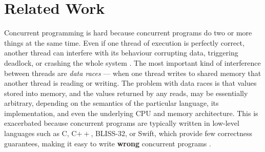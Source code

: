 \section{Related Work}
	
%


Concurrent programming is hard \cite{lea98,concurrentHard}
%
%
%
because concurrent programs do two or more things at the same
time. Even if one thread of execution is perfectly correct, another
thread can interfere with its behaviour corrupting data, triggering
deadlock, or crashing the whole system \cite{fonesca2010}.
%
%
The most important kind of interference between threads are
\textit{data races} --- when one thread writes to shared memory that
another thread is reading or writing. 
The problem with data races is
that values stored into memory, and the values returned by any reads,
may be essentially arbitrary, depending on the semantics of the
particular language, its implementation, and even the underlying CPU
and memory architecture.
%
This is exacerbated because concurrent programs are typically written in low-level languages
such as C, C$++$, BLISS-32, or Swift, which provide
few correctness guarantees, making it easy to write \textbf{wrong}
concurrent programs
\cite{CCppSCAM2014,LuSurvey2008}.
%
%
%
%
%

